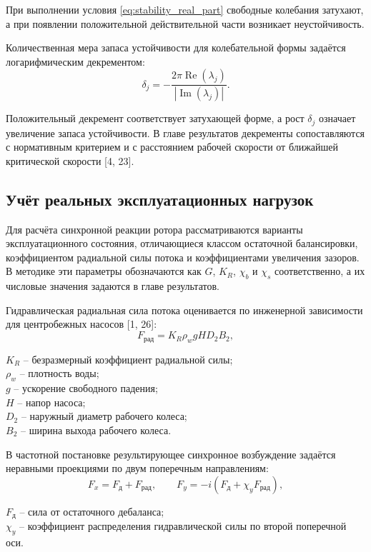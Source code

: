 При выполнении условия \eqref{eq:stability_real_part} свободные колебания затухают, а при появлении положительной действительной части возникает неустойчивость.

Количественная мера запаса устойчивости для колебательной формы задаётся логарифмическим декрементом:
\begin{equation}
    \delta_j=-\frac{2\pi\operatorname{Re}(\lambda_j)}{|\operatorname{Im}(\lambda_j)|}.
    \label{eq:log_decrement}
\end{equation}

Положительный декремент соответствует затухающей форме, а рост $\delta_j$ означает увеличение запаса устойчивости. В главе результатов декременты сопоставляются с нормативным критерием и с расстоянием рабочей скорости от ближайшей критической скорости [4, 23].

\subsection{Учёт реальных эксплуатационных нагрузок}

Для расчёта синхронной реакции ротора рассматриваются варианты эксплуатационного состояния, отличающиеся классом остаточной балансировки, коэффициентом радиальной силы потока и коэффициентами увеличения зазоров. В методике эти параметры обозначаются как $G$, $K_R$, $\chi_b$ и $\chi_s$ соответственно, а их числовые значения задаются в главе результатов.

Гидравлическая радиальная сила потока оценивается по инженерной зависимости для центробежных насосов [1, 26]:
\begin{equation}
    F_{\text{рад}}=K_R\rho_w gH D_2B_2,
    \label{eq:hydraulic_force_stage}
\end{equation}
\begin{conditions}
$K_R$ -- безразмерный коэффициент радиальной силы;\\
$\rho_w$ -- плотность воды;\\
$g$ -- ускорение свободного падения;\\
$H$ -- напор насоса;\\
$D_2$ -- наружный диаметр рабочего колеса;\\
$B_2$ -- ширина выхода рабочего колеса.
\end{conditions}

В частотной постановке результирующее синхронное возбуждение задаётся неравными проекциями по двум поперечным направлениям:
\begin{equation}
    F_x=F_{\text{д}}+F_{\text{рад}},\qquad F_y=-i(F_{\text{д}}+\chi_yF_{\text{рад}}),
    \label{eq:hydraulic_force_components}
\end{equation}
\begin{conditions}
$F_{\text{д}}$ -- сила от остаточного дебаланса;\\
$\chi_y$ -- коэффициент распределения гидравлической силы по второй поперечной оси.
\end{conditions}

